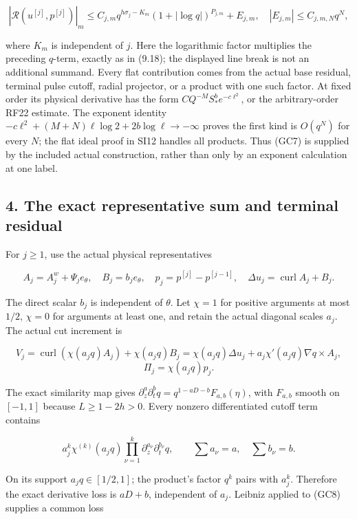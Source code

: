 \documentclass[10pt,a4paper]{article}
\begin{document}
\[
|\mathcal R(u^{[j]},p^{[j]})|_m
\le C_{j,m}q^{h\sigma_j-K_m}
(1+|\log q|)^{P_{j,m}}+E_{j,m},
\quad |E_{j,m}|\le C_{j,m,N}q^N,
\tag{GC7}
\]

where \(K_m\) is independent of \(j\). Here the logarithmic factor multiplies the preceding \(q\)-term, exactly as in (9.18); the displayed line break is not an additional summand. Every flat contribution comes from the actual base residual, terminal pulse cutoff, radial projector, or a product with one such factor. At fixed order its physical derivative has the form \(CQ^{-M}S_*^b e^{-c\ell^2}\), or the arbitrary-order RF22 estimate. The exponent identity \(-c\ell^2+(M+N)\ell\log2+2b\log\ell\to-\infty\) proves the first kind is \(O(q^N)\) for every \(N\); the flat ideal proof in SI12 handles all products. Thus (GC7) is supplied by the included actual construction, rather than only by an exponent calculation at one label.

\subsection{4. The exact representative sum and terminal residual}\label{gclosure:the-exact-representative-sum-and-terminal-residual}

For \(j\ge1\), use the actual physical representatives

\[
A_j=A_j^w+\Psi_je_\theta,\quad B_j=b_je_\theta,
\quad p_j=p^{[j]}-p^{[j-1]},
\quad\Delta u_j=\operatorname{curl}A_j+B_j.
\]

The direct scalar \(b_j\) is independent of \(\theta\). Let \(\chi=1\) for positive arguments at most \(1/2\), \(\chi=0\) for arguments at least one, and retain the actual diagonal scales \(a_j\). The actual cut increment is

\[
V_j=\operatorname{curl}(\chi(a_jq)A_j)+\chi(a_jq)B_j
=\chi(a_jq)\Delta u_j+a_j\chi'(a_jq)\nabla q\times A_j,
\] \[
\Pi_j=\chi(a_jq)p_j.
\tag{GC8}
\]

The exact similarity map gives \(\partial_z^a\partial_t^bq=q^{1-aD-b}F_{a,b}(\eta)\), with \(F_{a,b}\) smooth on \([-1,1]\) because \(L\ge1-2h>0\). Every nonzero differentiated cutoff term contains

\[
a_j^k\chi^{(k)}(a_jq)
\prod_{\nu=1}^k\partial_z^{a_\nu}\partial_t^{b_\nu}q,
\qquad \sum a_\nu=a,\quad\sum b_\nu=b.
\]

On its support \(a_jq\in[1/2,1]\); the product's factor \(q^k\) pairs with \(a_j^k\). Therefore the exact derivative loss is \(aD+b\), independent of \(a_j\). Leibniz applied to (GC8) supplies a common loss
\end{document}
